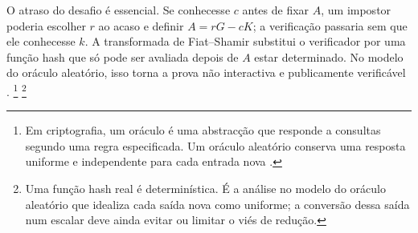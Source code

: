 
O atraso do desafio é essencial. Se conhecesse \(c\) antes de fixar \(A\), um
impostor poderia escolher \(r\) ao acaso e definir \(A=rG-cK\); a verificação
passaria sem que ele conhecesse \(k\). A transformada de Fiat--Shamir
\cite{fiat-shamir-transform} substitui o verificador por uma função hash que só
pode ser avaliada depois de \(A\) estar determinado. No modelo do oráculo
aleatório, isso torna a prova não interactiva e publicamente verificável
\cite{Signatures2015BorromeanRS}.
\footnote{Em criptografia, um oráculo é uma abstracção que responde a consultas
segundo uma regra especificada. Um oráculo aleatório conserva uma resposta
uniforme e independente para cada entrada nova \cite{cryptographic-oracle}.}
\footnote{Uma função hash real é determinística. É a análise no modelo do
oráculo aleatório que idealiza cada saída nova como uniforme; a conversão dessa
saída num escalar deve ainda evitar ou limitar o viés de redução.}
